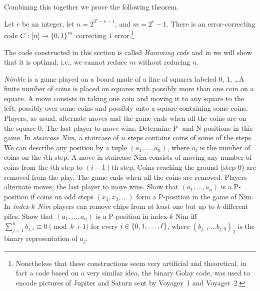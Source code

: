 Combining this together we prove the following theorem.
\begin{theorem}
  Let $r$ be an integer, let $n = 2^{2^r - r - 1}$, and $m = 2^r - 1$.
  There is an error-correcting code $C : \range{n} \to \set{0, 1}^m$
  correcting $1$ error.\footnote{%
    Nonetheless that these constructions seem very artificial and theoretical,
    in fact a code based on a very similar idea, the binary Golay code, was used
    to encode pictures of Jupiter and Saturn sent by Voyager~1 and Voyager~2.
  }
\end{theorem}
The code constructed in this section is called \emph{Hamming code} and in
 we will show that it is optimal; i.e., we cannot
reduce $m$ without reducing $n$.

\begin{chapterendexercises}
  \exercise \emph{Nimble} is a game played on a board made of a line of squares
    labeled $0$, $1$, \dots A finite number of coins is placed on squares with
    possibly more than one coin on a square. A move consists in taking one coin
    and moving it to any square to the left, possibly over some coins and
    possibly onto a square containing some coins. Players, as usual, alternate
    moves and the game ends when all the coins are on the square $0$. The last
    player to move wins. Determine P- and N-positions in this game.
  \exercise In \emph{staircase Nim}, a staircase of $n$ steps contains coins of
    some of the steps. We can describe any position by a tuple $(a_1, \dots, a_n)$,
    where $a_i$ is the number of coins on the $i$th step. A move in staircase
    Nim consists of moving any number of coins from the $i$th step to 
    $(i - 1)$th step. Coins reaching the ground (step $0$) are removed from the
    play. The game ends when all the coins are removed. Players alternate moves;
    the last player to move wins. Show that $(a_1, \dots, a_n)$ is a P-position
    if coins on odd steps $(x_1, x_3, \dots)$ form a P-position in the game of
    Nim.
  \exercise In \emph{index-$k$ Nim} players can remove chips from at least
    one but up to $k$ different piles. Show that $(a_1, \dots, a_n)$ is a
    P-position in index-$k$ Nim iff 
    $\sum_{j = 1}^n b_{j, i} \equiv 0 \pmod{k + 1}$ for every 
    $i \in \set{0, 1, \dots, \ell}$, where $(b_{j, \ell} \dots b_{j, 0})_2$ is
    the binary representation of $a_j$.
\end{chapterendexercises}
